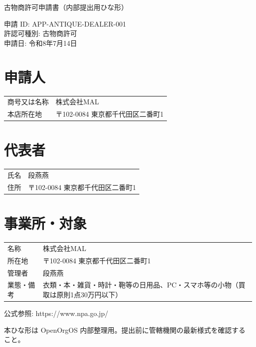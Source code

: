 \documentclass[11pt,a4paper]{article}
\begin{document}
\begin{center}
{\Large 古物商許可申請書（内部提出用ひな形）}
\end{center}

\vspace{1em}
\noindent 申請 ID: APP-ANTIQUE-DEALER-001 \\
許認可種別: 古物商許可 \\
申請日: 令和8年7月14日

\section*{申請人}
\begin{tabular}{ll}
商号又は名称 & 株式会社MAL \\
本店所在地 & 〒102-0084 東京都千代田区二番町1 \\
\end{tabular}

\section*{代表者}
\begin{tabular}{ll}
氏名 & 段燕燕 \\
住所 & 〒102-0084 東京都千代田区二番町1 \\
\end{tabular}

\section*{事業所・対象}
\begin{tabular}{ll}
名称 & 株式会社MAL \\
所在地 & 〒102-0084 東京都千代田区二番町1 \\
管理者 & 段燕燕 \\
業態・備考 & 衣類・本・雑貨・時計・鞄等の日用品、PC・スマホ等の小物（買取は原則1点30万円以下） \\
\end{tabular}

\vfill
\small 公式参照: https://www.npa.go.jp/
\par\noindent\small 本ひな形は OpenOrgOS 内部整理用。提出前に管轄機関の最新様式を確認すること。
\end{document}
